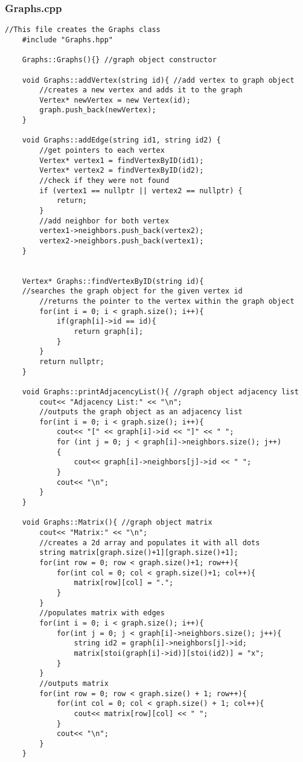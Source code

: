 \documentclass[letterpaper, 10pt,DIV=13]{scrartcl}
\numberwithin{equation}{section} %
\numberwithin{figure}{section} %
\numberwithin{table}{section} %
\begin{document}
\subsubsection*{Graphs.cpp}
    \lstset{numbers=left, numberstyle=\tiny, stepnumber=1, numbersep=5pt, basicstyle=\footnotesize\ttfamily}
    \begin{lstlisting}[frame=single, ]
    //This file creates the Graphs class
    #include "Graphs.hpp"
    
    Graphs::Graphs(){} //graph object constructor
    
    void Graphs::addVertex(string id){ //add vertex to graph object
        //creates a new vertex and adds it to the graph
        Vertex* newVertex = new Vertex(id);
        graph.push_back(newVertex);
    }
    
    void Graphs::addEdge(string id1, string id2) {
        //get pointers to each vertex
        Vertex* vertex1 = findVertexByID(id1);
        Vertex* vertex2 = findVertexByID(id2);
        //check if they were not found
        if (vertex1 == nullptr || vertex2 == nullptr) {
            return;
        }
        //add neighbor for both vertex
        vertex1->neighbors.push_back(vertex2);
        vertex2->neighbors.push_back(vertex1);
    }
    
    
    Vertex* Graphs::findVertexByID(string id){ 
    //searches the graph object for the given vertex id
        //returns the pointer to the vertex within the graph object
        for(int i = 0; i < graph.size(); i++){
            if(graph[i]->id == id){
                return graph[i];
            }
        }
        return nullptr;
    }
    
    void Graphs::printAdjacencyList(){ //graph object adjacency list
        cout<< "Adjacency List:" << "\n";
        //outputs the graph object as an adjacency list
        for(int i = 0; i < graph.size(); i++){
            cout<< "[" << graph[i]->id << "]" << " ";
            for (int j = 0; j < graph[i]->neighbors.size(); j++)
            {
                cout<< graph[i]->neighbors[j]->id << " ";
            }
            cout<< "\n";
        }
    }
    
    void Graphs::Matrix(){ //graph object matrix
        cout<< "Matrix:" << "\n";
        //creates a 2d array and populates it with all dots
        string matrix[graph.size()+1][graph.size()+1];
        for(int row = 0; row < graph.size()+1; row++){
            for(int col = 0; col < graph.size()+1; col++){
                matrix[row][col] = ".";
            }
        }
        //populates matrix with edges
        for(int i = 0; i < graph.size(); i++){
            for(int j = 0; j < graph[i]->neighbors.size(); j++){
                string id2 = graph[i]->neighbors[j]->id;
                matrix[stoi(graph[i]->id)][stoi(id2)] = "x";
            }
        }
        //outputs matrix
        for(int row = 0; row < graph.size() + 1; row++){
            for(int col = 0; col < graph.size() + 1; col++){
                cout<< matrix[row][col] << " ";
            }
            cout<< "\n";
        }
    }
    

\end{lstlisting}
\end{document}
